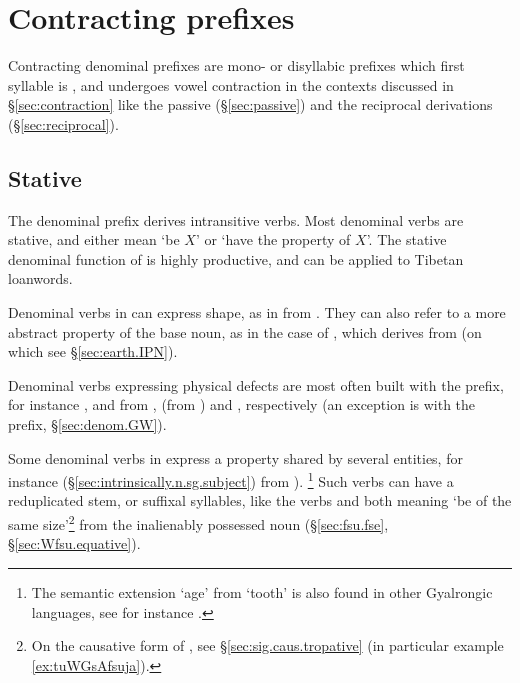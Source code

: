   
 
\section{Contracting prefixes} \label{sec:denom.contracting}
Contracting denominal prefixes are mono- or disyllabic prefixes which first syllable is , and undergoes vowel contraction in the contexts discussed in §\ref{sec:contraction} like the passive  (§\ref{sec:passive}) and the reciprocal derivations (§\ref{sec:reciprocal}).
 
\subsection{Stative } \label{sec:denom.a}
The denominal prefix   derives intransitive verbs. Most  denominal verbs are stative, and either mean `be $X$' or `have the property of $X$'. The stative denominal function of  is highly productive, and can be applied to Tibetan loanwords. 

Denominal verbs in  can express shape, as in  from . They can also refer to a more abstract property of the base noun, as in the case of , which derives from  (on which see §\ref{sec:earth.IPN}).
 
Denominal verbs expressing physical defects are most often built with the  prefix, for instance ,  and  from ,  (from ) and , respectively (an exception is  with the  prefix, §\ref{sec:denom.GW}).

Some denominal verbs in  express a property shared by several entities, for instance  (§\ref{sec:intrinsically.n.sg.subject}) from ). \footnote{The semantic extension `age' from `tooth' is also found in other Gyalrongic languages, see for instance \citet[524]{lai17khroskyabs}.} Such verbs can have a reduplicated stem, or suffixal syllables, like the verbs   and  both meaning `be of the same size'\footnote{On the causative form of , see §\ref{sec:sig.caus.tropative} (in particular example \ref{ex:tuWGsAfsuja}). } from the inalienably possessed noun  (§\ref{sec:fsu.fse}, §\ref{sec:Wfsu.equative}).

